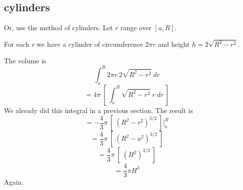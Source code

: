 \documentclass[11pt, oneside]{article}
\begin{document}
\subsection*{cylinders}
Or, use the method of cylinders.  Let $r$ range over $[a,R]$.  

For each $r$ we have a cylinder of circumference $2 \pi r$ and height $h = 2\sqrt{R^2 - r^2}$.  

The volume is
\[ \int_a^R 2 \pi r \  2\sqrt{R^2 - r^2} \ dr \]
\[ = 4 \pi \ [ \ \int_a^R \sqrt{R^2 - r^2} \ r \ dr \ ] \]
We already did this integral in a previous section.  The result is
\[ = -\frac{4}{3} \pi \ [ \ (R^2 - r^2)^{3/2} \ ] \bigg |_a^R  \]
\[ = \frac{4}{3} \pi \ [ \ (R^2 - a^2)^{3/2} \ ]  \]
\[ = \frac{4}{3} \pi \ [ \ (H^2)^{3/2} \ ]  \]
\[ = \frac{4}{3} \pi H^3 \]
Again.
\end{document}
